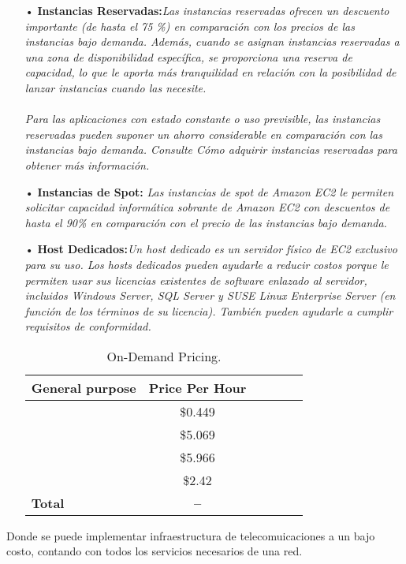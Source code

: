 \begin{itemize}
\item[•] \textbf{Instancias Reservadas:}\textit{Las instancias reservadas ofrecen un descuento importante (de hasta el 75 \%) en comparación con los precios de las instancias bajo demanda. Además, cuando se asignan instancias reservadas a una zona de disponibilidad específica, se proporciona una reserva de capacidad, lo que le aporta más tranquilidad en relación con la posibilidad de lanzar instancias cuando las necesite.
\\
\\
Para las aplicaciones con estado constante o uso previsible, las instancias reservadas pueden suponer un ahorro considerable en comparación con las instancias bajo demanda. Consulte Cómo adquirir instancias reservadas para obtener más información.}
\item[•] \textbf{Instancias de Spot:} \textit{Las instancias de spot de Amazon EC2 le permiten solicitar capacidad informática sobrante de Amazon EC2 con descuentos de hasta el 90\% en comparación con el precio de las instancias bajo demanda.}
\item[•] \textbf{Host Dedicados:}\textit{Un host dedicado es un servidor físico de EC2 exclusivo para su uso. Los hosts dedicados pueden ayudarle a reducir costos porque le permiten usar sus licencias existentes de software enlazado al servidor, incluidos Windows Server, SQL Server y SUSE Linux Enterprise Server (en función de los términos de su licencia). También pueden ayudarle a cumplir requisitos de conformidad.}


\begin{table}[ht]
	\caption{On-Demand Pricing.}
	\label{tab:hla:results}
\centering
\begin{tabular}{lccccc}
	\toprule
	\multicolumn{1}{c}{\textbf{General purpose}} 	& \textbf{Price Per Hour}\\
	\midrule
\cite{a1} 		& \$0.449\\
\cite{m5} 		& \$5.069\\
\cite{m5d}		& \$5.966\\
\cite{m4} 		& \$2.42\\

	\midrule
	\textbf{Total}			& \textbf{--}	\\
	\bottomrule
\end{tabular}
\end{table}


\end{itemize}

Donde se puede implementar infraestructura de telecomuicaciones a un bajo costo, contando con todos los servicios necesarios de una red.
